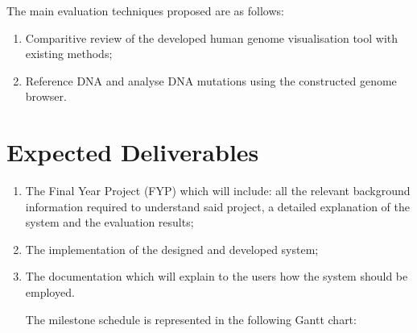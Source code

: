 \documentclass{csfyp}
\begin{document}
The main evaluation techniques proposed are as follows:

\begin{enumerate}[nolistsep]

  \item Comparitive review of the developed human genome visualisation tool with existing methods;

  \item Reference DNA and analyse DNA mutations using the constructed genome browser.

\end{enumerate}


\section{Expected Deliverables}

\begin{enumerate}[nolistsep]

  \item The Final Year Project (FYP) which will include: all the relevant background information required to understand said project, a detailed explanation of the system and the evaluation results; 

  \item The implementation of the designed and developed system;

  \item The documentation which will explain to the users how the system should be employed. 

The milestone schedule is represented in the following Gantt chart: \\

\noindent{}

\end{enumerate}


%

\nocite{*}

\end{document}
